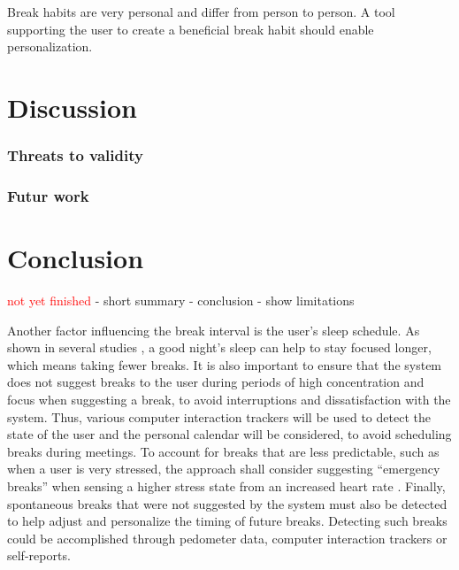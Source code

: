 \documentclass{hasel_thesis}
\begin{document}
\begin{tcolorbox}[colback=white!5!white,colframe=black!75!black]
 Break habits are very personal and differ from person to person. A tool supporting the user to create a beneficial break habit should enable personalization.
\end{tcolorbox}


\chapter{Discussion}

\subsection{Threats to validity}

\subsection{Futur work}

\chapter{Conclusion}
\textcolor{red}{not yet finished}
%
- short summary
- conclusion
    - show limitations



Another factor influencing the break interval is the user's sleep schedule. As shown in several studies \cite{Rosekind.2010} \cite{Gingerich.2017} \cite{Choi.2018}, a good night's sleep  can help to stay focused longer, which means taking fewer breaks. 
It is also important to ensure that the system does not suggest breaks to the user during periods of high concentration and focus when suggesting a break, to avoid interruptions and dissatisfaction with the system. Thus, various computer interaction trackers will be used to detect the state of the user and the personal calendar will be considered, to avoid scheduling breaks during meetings. 
To account for breaks that are less predictable, such as when a user is very stressed, the approach shall consider suggesting “emergency breaks” when sensing a higher stress state from an increased heart rate \cite{Hjortskov.2004}. 
Finally, spontaneous breaks that were not suggested by the system must also be detected to help adjust and personalize the timing of future breaks. Detecting such breaks could be accomplished through pedometer data, computer interaction trackers or self-reports. 
\end{document}

